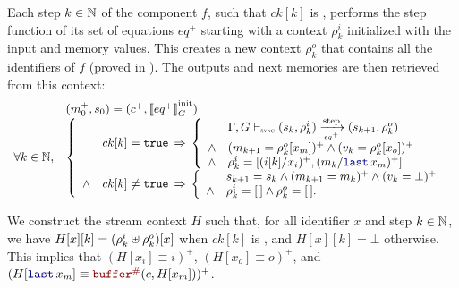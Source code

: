 \begin{skippableproof}
    Each step $k \in \mathbb{N}$ of the component $f$, such that $ck[k]$ is \true, performs the
    step function of its set of equations $eq^+$ starting with a context $\rho^i_k$ initialized with
    the input and memory values. This creates a new context $\rho^o_k$ that contains all the
    identifiers of $f$ (proved in ). The outputs and next
    memories are then retrieved from this context:
    \begin{equation*}
        \begin{array}{ll}
                              & (m_0^+, s_0) = (c^+, \initsync{eq^+}) \\
            \forall k \in \N, &
            \left\{
            \begin{array}{ll}
                       & ck[k] = \true \, \Rightarrow \,
                \left\{
                \begin{array}{ll}
                           & \eqOpsem{\rho^i_k}{s_k}{eq^+}{s_{k+1}}{\rho^o_k}           \\
                    \wedge & (m_{k+1} = \rho^o_k[x_m])^+ \wedge (v_k = \rho^o_k[x_o])^+ \\
                    \wedge & \rho^i_k = [(i[k]/x_i)^+, (m_k/\last{x_m})^+]              \\
                \end{array}
                \right.                                     \\
                \wedge & ck[k] \neq \true \, \Rightarrow \,
                \left\{
                \begin{array}{ll}
                           & s_{k+1} = s_k \wedge (m_{k+1} = m_k)^+ \wedge (v_k = \bot)^+ \\
                    \wedge & \rho^i_k = \emptyrho \wedge \rho^o_k = \emptyrho.            \\
                \end{array}
                \right.                                     \\
            \end{array}
            \right.                                                   \\
        \end{array}
    \end{equation*}

    We construct the stream context $H$ such that, for all identifier $x$ and step $k\in\mathbb{N}$,
    we have $H[x][k]=(\rho^i_k \uplus \rho^o_k)[x]$ when $ck[k]$ is \true, and $H[x][k]=\bot$
    otherwise. This implies that $(H[x_i] \equiv i)^+$, $(H[x_o] \equiv o)^+$, and
    $(H[\last{x_m}] \equiv \buffer{c}{H[x_m]})^+$.


\end{skippableproof}
